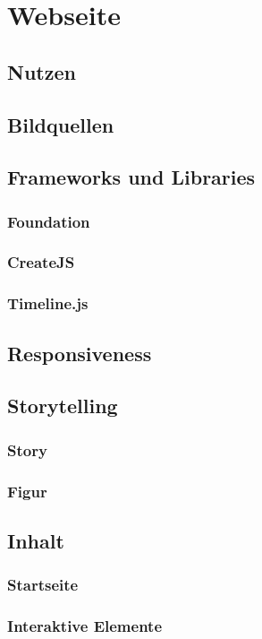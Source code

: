\section{Webseite}
\subsection{Nutzen}
\subsection{Bildquellen}
\subsection{Frameworks und Libraries}
\subsubsection{Foundation}
\subsubsection{CreateJS}
\subsubsection{Timeline.js}
\subsection{Responsiveness}
\subsection{Storytelling}
\subsubsection{Story}
\subsubsection{Figur}

\subsection{Inhalt}
\subsubsection{Startseite}

\subsubsection{Interaktive Elemente}

